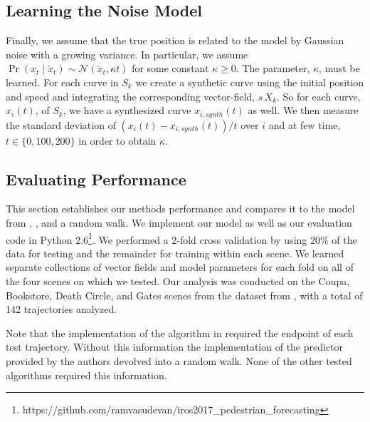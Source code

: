\documentclass[letterpaper,10pt,conference]{ieeetran}
\begin{document}
  \subsection{Learning the Noise Model}
  Finally, we assume that the true position is related to the model by Gaussian noise with a growing variance.
  In particular, we assume $\Pr( x_t \mid \check{x}_t) \sim \mathcal{N}( \check{x}_t , \kappa t)$ for some constant $\kappa \geq 0$.
  The parameter, $\kappa$, must be learned.
  For each curve in $S_k$ we create a synthetic curve using the initial position and speed and integrating the corresponding vector-field, $s\, X_k$.
  So for each curve, $x_i(t)$, of $S_k$, we have a synthesized curve $x_{i,synth}(t)$ as well.
  We then measure the standard deviation of $(x_i(t) - x_{i,synth}(t)) / t$ over $i$ and at few time, $t \in \{ 0, 100, 200 \}$ in order to obtain $\kappa$.
  
 \subsection{Evaluating Performance}
 
This section establishes our methods performance and compares it to the model from \cite{Kitani2012}, \cite{Alahi2016}, and a random walk.
We implement our model as well as our evaluation code in Python 2.6\footnote{https://github.com/ramvasudevan/iros2017\_pedestrian\_forecasting}.
We performed a 2-fold cross validation by using 20\% of the data for testing and the remainder for training within each scene. 
	We learned separate collections of vector fields and model parameters for each fold on all of the four scenes on which we tested.
Our analysis was conducted on the Coupa, Bookstore, Death Circle, and Gates scenes from the dataset from \cite{Robicquet2016}, with a total of 142 trajectories analyzed.



Note that the implementation of the algorithm in \cite{Kitani2012} required the endpoint of each test trajectory. 
Without this information the implementation of the predictor provided by the authors devolved into a random walk.
None of the other tested algorithms required this information.
\end{document}
